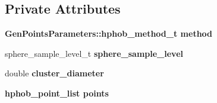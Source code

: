 \subsection*{Private Attributes}
\begin{CompactItemize}
\item 
\bf{Gen\-Points\-Parameters::hphob\_\-method\_\-t} \textbf{method}\label{classASCbase_1_1HphobPoints_11e6f8bf6d7faea419a39d6621f92326}

\item 
sphere\_\-sample\_\-level\_\-t \textbf{sphere\_\-sample\_\-level}\label{classASCbase_1_1HphobPoints_4ff1dda43958356e4730427317c5da34}

\item 
double \textbf{cluster\_\-diameter}\label{classASCbase_1_1HphobPoints_888ec8caee69ebb771ec15f155da32cc}

\item 
\bf{hphob\_\-point\_\-list} \textbf{points}\label{classASCbase_1_1HphobPoints_1c0b6a46ce1914e4d1e6778d6fbb04ad}

\end{CompactItemize}
